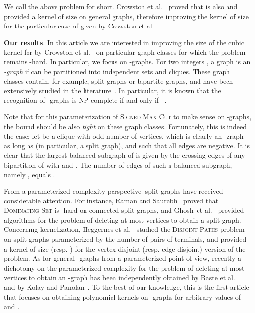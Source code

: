 \documentclass[
final
]{dmtcs-episciences}
\begin{document}
We call the above problem {} for short. Crowston et al.~\cite{crowston2013maximum} proved that {} is also {}  and provided a kernel of size
  on general graphs, therefore improving the kernel of size
  for the particular case of {} given by Crowston et al.~\cite{crowston2012max}.

\vspace{.15cm}\noindent
\textbf{Our results}. In this article we are interested in improving the size of the cubic kernel for {} by Crowston et al.~\cite{crowston2013maximum} on particular graph classes for which the problem remains {}-hard. In particular, we focus on -graphs. For two integers , a graph  is an \emph{-graph} if  can be partitioned into  independent sets and  cliques. These graph classes contain, for example, split graphs or bipartite graphs, and have been extensively studied in the literature~\cite{FoHa77,Golumbic04,book-graph-classes,Bra96,FHKM03,BFKS15,KoPa15}. In particular,
it is known that the recognition of -graphs is {\sf NP}-complete if and only if ~\cite{Bra96,FHKM03}.


Note that for this parameterization of  \textsc{Signed Max Cut} to make sense on -graphs, the bound  should be also {\sl tight} on these graph classes. Fortunately, this is indeed the case: let  be a clique with odd number of vertices, which is clearly an -graph as long as  (in particular, a split graph), and such that all edges are negative. It is clear that the largest balanced subgraph of  is given by the crossing edges of any bipartition  of  with  and . The number of edges of such a balanced subgraph, namely  , equals  .


From a parameterized complexity perspective, split graphs have received considerable attention. For instance, Raman and Saurabh~\cite{RamanS08} proved that \textsc{Dominating Set} is {}-hard on connected split graphs, and Ghosh~et al.~\cite{GhoshK0MPRR15} provided  {}-algorithms for the problem of deleting at most  vertices to obtain a split graph. Concerning kernelization, Heggernes et al.~\cite{HeggernesHLS15} studied the \textsc{Disjoint Paths} problem on split graphs parameterized by the number of pairs of terminals, and provided a kernel of size  (resp. ) for the vertex-disjoint (resp. edge-disjoint) version of the problem. As for general -graphs from a parameterized point of view, recently a dichotomy on the parameterized complexity for the problem of deleting at most  vertices to obtain an -graph has been independently obtained by Baste et al.~\cite{BFKS15} and by Kolay and Panolan~\cite{KoPa15}. To the best of our knowledge, this is the first article that focuses on obtaining polynomial kernels on -graphs for arbitrary values of  and .
\end{document}
